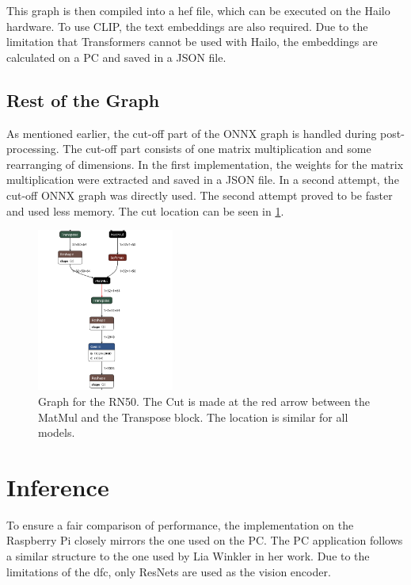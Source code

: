 This graph is then compiled into a \acrshort{hef} file, which can be executed on the Hailo hardware.
To use CLIP, the text embeddings are also required.
Due to the limitation that Transformers cannot be used with Hailo, the embeddings are calculated on a PC and saved in a JSON file.

\subsection{Rest of the Graph}

As mentioned earlier, the cut-off part of the ONNX graph is handled during post-processing. 
The cut-off part consists of one matrix multiplication and some rearranging of dimensions. 
In the first implementation, the weights for the matrix multiplication were extracted and saved in a JSON file.
In a second attempt, the cut-off ONNX graph was directly used.
The second attempt proved to be faster and used less memory.
The cut location can be seen in \cref{fig:implementation:RNcut}.

\begin{figure}
    \centering
    \includegraphics[width=0.4\textwidth]{Images/Implementation/firstcutlocation.png}
    \caption{Graph for the RN50. The Cut is made at the red arrow between the MatMul and the Transpose block.
    The location is similar for all models.}
    \label{fig:implementation:RNcut}
\end{figure}
\section{Inference}

To ensure a fair comparison of performance, the implementation on the Raspberry Pi closely mirrors the one used on the PC. 
The PC application follows a similar structure to the one used by Lia Winkler in her work.
Due to the limitations of the \acrshort{dfc}, only ResNets are used as the vision encoder.


